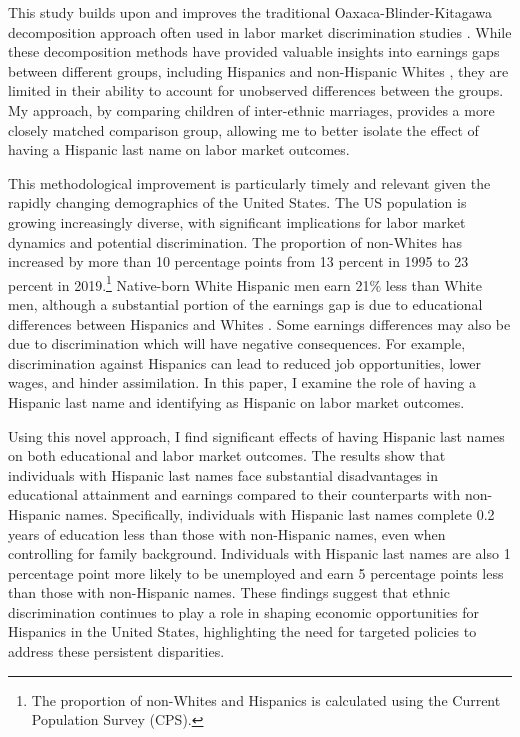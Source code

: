 This study builds upon and improves the traditional Oaxaca-Blinder-Kitagawa decomposition approach often used in labor market discrimination studies \autocite{oaxaca1973male,blinder1973wage,kitagawa1955components}. While these decomposition methods have provided valuable insights into earnings gaps between different groups, including Hispanics and non-Hispanic Whites \autocite{davilaChangesRelativeEarnings2008}, they are limited in their ability to account for unobserved differences between the groups. My approach, by comparing children of inter-ethnic marriages, provides a more closely matched comparison group, allowing me to better isolate the effect of having a Hispanic last name on labor market outcomes.

This methodological improvement is particularly timely and relevant given the rapidly changing demographics of the United States. The US population is growing increasingly diverse, with significant implications for labor market dynamics and potential discrimination. The proportion of non-Whites has increased by more than 10 percentage points from 13 percent in 1995 to 23 percent in 2019.\footnote{The proportion of non-Whites and Hispanics is calculated using the Current Population Survey (CPS).} Native-born White Hispanic men earn 21\% less than White men, although a substantial portion of the earnings gap is due to educational differences between Hispanics and Whites \autocite{duncan2006hispanics, duncan2018identifying, duncan2018socioeconomic}. Some earnings differences may also be due to discrimination which will have negative consequences. For example, discrimination against Hispanics can lead to reduced job opportunities, lower wages, and hinder assimilation. In this paper, I examine the role of having a Hispanic last name and identifying as Hispanic on labor market outcomes. 

Using this novel approach, I find significant effects of having Hispanic last names on both educational and labor market outcomes. The results show that individuals with Hispanic last names face substantial disadvantages in educational attainment and earnings compared to their counterparts with non-Hispanic names. Specifically, individuals with Hispanic last names complete 0.2 years of education less than those with non-Hispanic names, even when controlling for family background. Individuals with Hispanic last names are also 1 percentage point more likely to be unemployed  and earn 5 percentage points less than those with non-Hispanic names. These findings suggest that ethnic discrimination continues to play a role in shaping economic opportunities for Hispanics in the United States, highlighting the need for targeted policies to address these persistent disparities.

